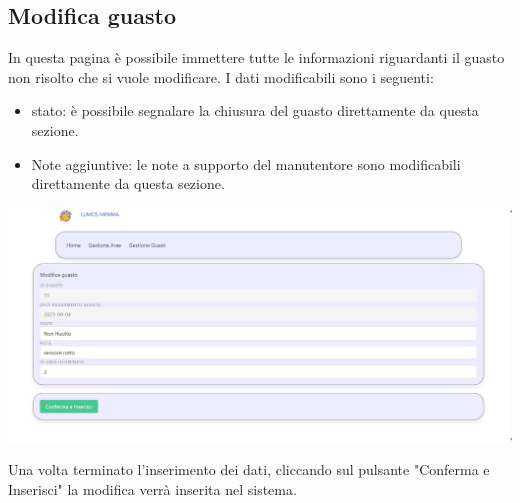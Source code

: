\documentclass[9pt]{article}
\begin{document}

\subsection{Modifica guasto}
In questa pagina è possibile immettere tutte le informazioni riguardanti il guasto non risolto che si vuole modificare.
I dati modificabili sono i seguenti:
\begin{itemize}
	\item stato: è possibile segnalare la chiusura del guasto direttamente da questa sezione.
	\item Note aggiuntive: le note a supporto del manutentore sono modificabili direttamente da questa sezione.
\end{itemize}

\begin{center}
	\includegraphics[scale=0.3]{Modifica_guasto.png}
\end{center}

Una volta terminato l'inserimento dei dati, cliccando sul pulsante "Conferma e Inserisci"
la modifica verrà inserita nel sistema.
\end{document}
